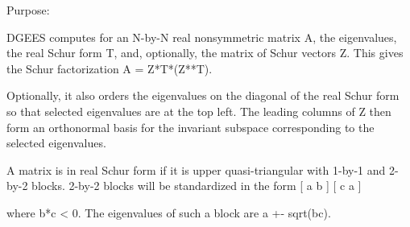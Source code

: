 \begin{DoxyParagraph}{Purpose\+: }
\begin{DoxyVerb} DGEES computes for an N-by-N real nonsymmetric matrix A, the
 eigenvalues, the real Schur form T, and, optionally, the matrix of
 Schur vectors Z.  This gives the Schur factorization A = Z*T*(Z**T).

 Optionally, it also orders the eigenvalues on the diagonal of the
 real Schur form so that selected eigenvalues are at the top left.
 The leading columns of Z then form an orthonormal basis for the
 invariant subspace corresponding to the selected eigenvalues.

 A matrix is in real Schur form if it is upper quasi-triangular with
 1-by-1 and 2-by-2 blocks. 2-by-2 blocks will be standardized in the
 form
         [  a  b  ]
         [  c  a  ]

 where b*c < 0. The eigenvalues of such a block are a +- sqrt(bc).\end{DoxyVerb}
 
\end{DoxyParagraph}

